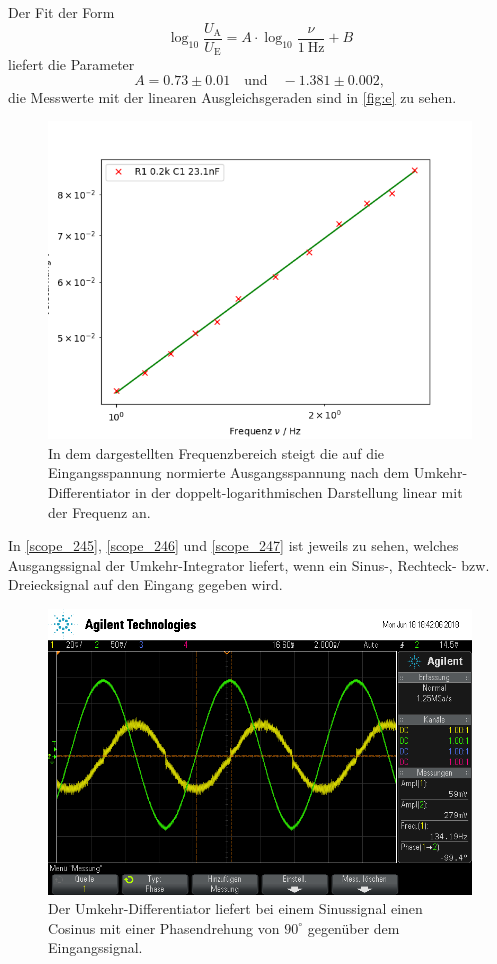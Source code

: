 Der Fit der Form
\begin{equation}
	\log_{10} \frac{U_\text{A}}{U_\text{E}} = A \cdot \log_{10} \frac{\nu}{\SI{1}{\hertz}} + B
\end{equation}
liefert die Parameter
\begin{equation}
	A = 0.73 \pm 0.01 \quad \text{und} \quad -1.381 \pm 0.002,
\end{equation}
die Messwerte mit der linearen Ausgleichsgeraden sind in \autoref{fig:e} zu sehen.
\begin{figure}[h]
	\centering
	\includegraphics[width=\textwidth]{img/e.png}
	\caption{In dem dargestellten Frequenzbereich steigt die auf die Eingangsspannung normierte Ausgangsspannung nach dem Umkehr-Differentiator in der doppelt-logarithmischen Darstellung linear mit der Frequenz an.}
	\label{fig:e}
\end{figure}
In \autoref{scope_245}, \autoref{scope_246} und \autoref{scope_247} ist jeweils zu sehen, welches Ausgangssignal der Umkehr-Integrator liefert, wenn ein Sinus-, Rechteck- bzw. Dreiecksignal auf den Eingang gegeben wird.
\begin{figure}[h]
	\centering
	\includegraphics[width=\textwidth]{usb/scope_245.png}
	\caption{Der Umkehr-Differentiator liefert bei einem Sinussignal einen Cosinus mit einer Phasendrehung von $90^\circ$ gegenüber dem Eingangssignal.}
	\label{scope_245}
\end{figure}
